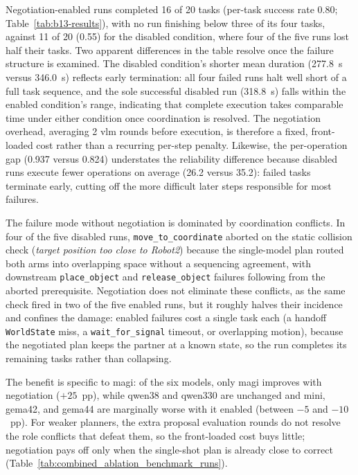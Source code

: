 \documentclass[
     12pt,
     a4paper,
     BCOR=10mm,
     DIV=14,
     listof=totoc,
     bibliography=totoc,
     parskip,
     twoside,
     headsepline
     ]{scrreprt}
\begin{document}
Negotiation-enabled runs completed 16 of 20 tasks (per-task success rate 0.80; Table~\ref{tab:b13-results}), with no run finishing below three of its four tasks, against 11 of 20 (0.55) for the disabled condition, where four of the five runs lost half their tasks. Two apparent differences in the table resolve once the failure structure is examined. The disabled condition's shorter mean duration (277.8~s versus 346.0~s) reflects early termination: all four failed runs halt well short of a full task sequence, and the sole successful disabled run (318.8~s) falls within the enabled condition's range, indicating that complete execution takes comparable time under either condition once coordination is resolved. The negotiation overhead, averaging 2 \gls{vlm} rounds before execution, is therefore a fixed, front-loaded cost rather than a recurring per-step penalty. Likewise, the per-operation gap (0.937 versus 0.824) understates the reliability difference because disabled runs execute fewer operations on average (26.2 versus 35.2): failed tasks terminate early, cutting off the more difficult later steps responsible for most failures.

The failure mode without negotiation is dominated by coordination conflicts. In four of the five disabled runs, \texttt{move\_to\_coordinate} aborted on the static collision check (\textit{target position too close to Robot2}) because the single-model plan routed both arms into overlapping space without a sequencing agreement, with downstream \texttt{place\_object} and \texttt{release\_object} failures following from the aborted prerequisite. Negotiation does not eliminate these conflicts, as the same check fired in two of the five enabled runs, but it roughly halves their incidence and confines the damage: enabled failures cost a single task each (a handoff \texttt{WorldState} miss, a \texttt{wait\_for\_signal} timeout, or overlapping motion), because the negotiated plan keeps the partner at a known state, so the run completes its remaining tasks rather than collapsing.

The benefit is specific to \gls{magi}: of the six models, only \gls{magi} improves with negotiation ($+25$~pp), while \gls{qwen38} and \gls{qwen330} are unchanged and \gls{mini}, \gls{gema42}, and \gls{gema44} are marginally worse with it enabled (between $-5$ and $-10$~pp). For weaker planners, the extra proposal evaluation rounds do not resolve the role conflicts that defeat them, so the front-loaded cost buys little; negotiation pays off only when the single-shot plan is already close to correct (Table~\ref{tab:combined_ablation_benchmark_runs}).
\end{document}
